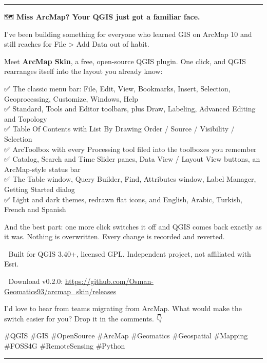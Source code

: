 \documentclass[11pt,a4paper]{article}
\newcommand{\emoji}[1]{{\emojifont #1}}
\begin{document}
\noindent\rule{\textwidth}{0.4pt}

\emoji{🗺️} \textbf{Miss ArcMap? Your QGIS just got a familiar face.}

I've been building something for everyone who learned GIS on ArcMap 10 and still reaches for File \textgreater{} Add Data out of habit.

Meet \textbf{ArcMap Skin}, a free, open-source QGIS plugin. One click, and QGIS rearranges itself into the layout you already know:

\emoji{✅} The classic menu bar: File, Edit, View, Bookmarks, Insert, Selection, Geoprocessing, Customize, Windows, Help \\
\emoji{✅} Standard, Tools and Editor toolbars, plus Draw, Labeling, Advanced Editing and Topology \\
\emoji{✅} Table Of Contents with List By Drawing Order / Source / Visibility / Selection \\
\emoji{✅} ArcToolbox with every Processing tool filed into the toolboxes you remember \\
\emoji{✅} Catalog, Search and Time Slider panes, Data View / Layout View buttons, an ArcMap-style status bar \\
\emoji{✅} The Table window, Query Builder, Find, Attributes window, Label Manager, Getting Started dialog \\
\emoji{✅} Light and dark themes, redrawn flat icons, and English, Arabic, Turkish, French and Spanish

And the best part: one more click switches it off and QGIS comes back exactly as it was. Nothing is overwritten. Every change is recorded and reverted.

\emoji{🧰} Built for QGIS 3.40+, licensed GPL. Independent project, not affiliated with Esri.

\emoji{🔗} Download v0.2.0: \url{https://github.com/Osman-Geomatics93/arcmap_skin/releases}

I'd love to hear from teams migrating from ArcMap. What would make the switch easier for you? Drop it in the comments. \emoji{👇}

\#QGIS \#GIS \#OpenSource \#ArcMap \#Geomatics \#Geospatial \#Mapping \#FOSS4G \#RemoteSensing \#Python

\noindent\rule{\textwidth}{0.4pt}
\end{document}

